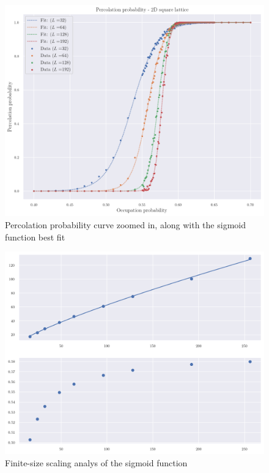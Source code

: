 \begin{figure}[H]
  \includegraphics[width=\linewidth]{Images/chap1_perc_prob_2.png}
  \caption{Percolation probability curve zoomed in, along with the sigmoid function best fit}
  \label{fig:chap1_perc_prob_2}
\end{figure}


\begin{figure}[H]
  \includegraphics[width=\linewidth]{Images/chap1_perc_prob_3.png}
  \caption{Finite-size scaling analys of the sigmoid function}
  \label{fig:chap1_perc_prob_3}
\end{figure}


